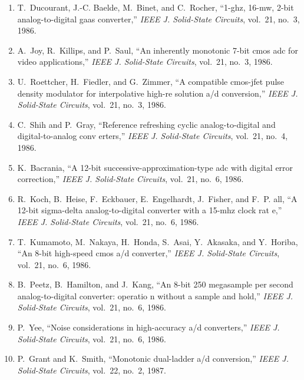 \begin{enumerate}
\item
T.~Ducourant, J.-C. Baelde, M.~Binet, and C.~Rocher, ``1-ghz, 16-mw, 2-bit
  analog-to-digital gaas converter,'' \emph{{IEEE} J. Solid-State Circuits},
  vol.~21, no.~3, 1986.

\item
A.~Joy, R.~Killips, and P.~Saul, ``An inherently monotonic 7-bit cmos adc for
  video applications,'' \emph{{IEEE} J. Solid-State Circuits}, vol.~21, no.~3,
  1986.

\item
U.~Roettcher, H.~Fiedler, and G.~Zimmer, ``A compatible cmos-jfet pulse density
  modulator for interpolative high-re solution a/d conversion,'' \emph{{IEEE}
  J. Solid-State Circuits}, vol.~21, no.~3, 1986.

\item
C.~Shih and P.~Gray, ``Reference refreshing cyclic analog-to-digital and
  digital-to-analog conv erters,'' \emph{{IEEE} J. Solid-State Circuits},
  vol.~21, no.~4, 1986.

\item
K.~Bacrania, ``A 12-bit successive-approximation-type adc with digital error
  correction,'' \emph{{IEEE} J. Solid-State Circuits}, vol.~21, no.~6, 1986.

\item
R.~Koch, B.~Heise, F.~Eckbauer, E.~Engelhardt, J.~Fisher, and F.~P. all, ``A
  12-bit sigma-delta analog-to-digital converter with a 15-mhz clock rat e,''
  \emph{{IEEE} J. Solid-State Circuits}, vol.~21, no.~6, 1986.

\item
T.~Kumamoto, M.~Nakaya, H.~Honda, S.~Asai, Y.~Akasaka, and Y.~Horiba, ``An
  8-bit high-speed cmos a/d converter,'' \emph{{IEEE} J. Solid-State Circuits},
  vol.~21, no.~6, 1986.

\item
B.~Peetz, B.~Hamilton, and J.~Kang, ``An 8-bit 250 megasample per second
  analog-to-digital converter: operatio n without a sample and hold,''
  \emph{{IEEE} J. Solid-State Circuits}, vol.~21, no.~6, 1986.

\item
P.~Yee, ``Noise considerations in high-accuracy a/d converters,'' \emph{{IEEE}
  J. Solid-State Circuits}, vol.~21, no.~6, 1986.

\item
P.~Grant and K.~Smith, ``Monotonic dual-ladder a/d conversion,'' \emph{{IEEE}
  J. Solid-State Circuits}, vol.~22, no.~2, 1987.


\end{enumerate}
